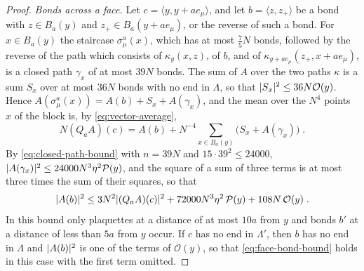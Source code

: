 \documentclass[11pt]{preprint}
\DeclarePairedDelimiter{\abs}{\lvert}{\rvert}
\numberwithin{equation}{section}
\theoremstyle{definition}
\theoremstyle{remark}
\theoremstyle{plain}
\begin{document}
\begin{proof}
\emph{Bonds across a face.} Let $c = \langle y, y + ae_\mu\rangle$, and let $b = \langle z, z_+\rangle$ be a bond with $z \in B_a(y)$ and $z_+ \in B_a(y + ae_\mu)$, or the reverse of such a bond. For $x \in B_a(y)$ the staircase $\sigma^a_\mu(x)$, which has at most $\frac75N$ bonds, followed by the reverse of the path which consists of $\kappa_y(x, z)$, of $b$, and of $\kappa_{y + ae_\mu}(z_+, x + ae_\mu)$, is a closed path $\gamma_x$ of at most $39N$ bonds. The sum of $A$ over the two paths $\kappa$ is a sum $S_x$ over at most $36N$ bonds with no end in $\Lambda$, so that $\abs{S_x}^2 \leq 36N\mathcal O(y)$. Hence $A(\sigma^a_\mu(x)) = A(b) + S_x + A(\gamma_x)$, and the mean over the $N^4$ points $x$ of the block is, by \eqref{eq:vector-average},
\begin{equation}\label{eq:face-bond}
    N(Q_aA)(c) = A(b) + N^{-4}\sum_{x \in B_a(y)}\bigl(S_x + A(\gamma_x)\bigr)\;.
\end{equation}
By \eqref{eq:closed-path-bound} with $n = 39N$ and $15 \cdot 39^2 \leq 24000$, $\abs{A(\gamma_x)}^2 \leq 24000N^3\eta^2\mathcal P(y)$, and the square of a sum of three terms is at most three times the sum of their squares, so that
\begin{equation}\label{eq:face-bond-bound}
    \abs{A(b)}^2 \leq 3N^2\abs{(Q_aA)(c)}^2 + 72000N^3\eta^2\,\mathcal P(y) + 108N\,\mathcal O(y)\;.
\end{equation}
In this bound only plaquettes at a distance of at most $10a$ from $y$ and bonds $b'$ at a distance of less than $5a$ from $y$ occur. If $c$ has no end in $\Lambda'$, then $b$ has no end in $\Lambda$ and $\abs{A(b)}^2$ is one of the terms of $\mathcal O(y)$, so that \eqref{eq:face-bond-bound} holds in this case with the first term omitted.


\end{proof}
\end{document}
